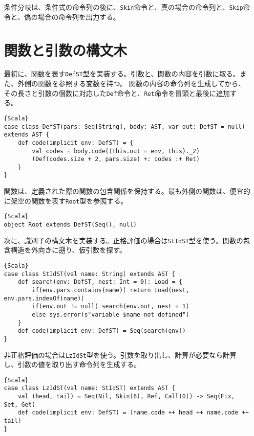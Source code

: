 \documentclass[10pt,a4paper]{book}
\begin{document}
条件分岐は、条件式の命令列の後に、\texttt{Skin}命令と、真の場合の命令列と、\texttt{Skip}命令と、偽の場合の命令列を出力する。

\section{関数と引数の構文木\label{sect:CallST}}

最初に、関数を表す\texttt{DefST}型を実装する。引数と、関数の内容を引数に取る。また、外側の関数を参照する変数を持つ。
関数の内容の命令列を生成してから、その長さと引数の個数に対応した\texttt{Def}命令と、\texttt{Ret}命令を冒頭と最後に追加する。

\begin{Verbatim}{Scala}
case class DefST(pars: Seq[String], body: AST, var out: DefST = null) extends AST {
	def code(implicit env: DefST) = {
		val codes = body.code((this.out = env, this)._2)
		(Def(codes.size + 2, pars.size) +: codes :+ Ret)
	}
}
\end{Verbatim}

関数は、定義された際の関数の包含関係を保持する。最も外側の関数は、便宜的に架空の関数を表す\texttt{Root}型を参照する。

\begin{Verbatim}{Scala}
object Root extends DefST(Seq(), null)
\end{Verbatim}

次に、識別子の構文木を実装する。正格評価の場合は\texttt{StIdST}型を使う。関数の包含構造を外向きに遡り、仮引数を探す。

\begin{Verbatim}{Scala}
case class StIdST(val name: String) extends AST {
	def search(env: DefST, nest: Int = 0): Load = {
		if(env.pars.contains(name)) return Load(nest, env.pars.indexOf(name))
		if(env.out != null) search(env.out, nest + 1)
		else sys.error(s"variable $name not defined")
	}
	def code(implicit env: DefST) = Seq(search(env))
}
\end{Verbatim}

非正格評価の場合は\texttt{LzIdSt}型を使う。引数を取り出し、計算が必要なら計算し、引数の値を取り出す命令列を生成する。

\begin{Verbatim}{Scala}
case class LzIdST(val name: StIdST) extends AST {
	val (head, tail) = Seq(Nil, Skin(6), Ref, Call(0)) -> Seq(Fix, Set, Get)
	def code(implicit env: DefST) = (name.code ++ head ++ name.code ++ tail)
}
\end{Verbatim}
\end{document}
